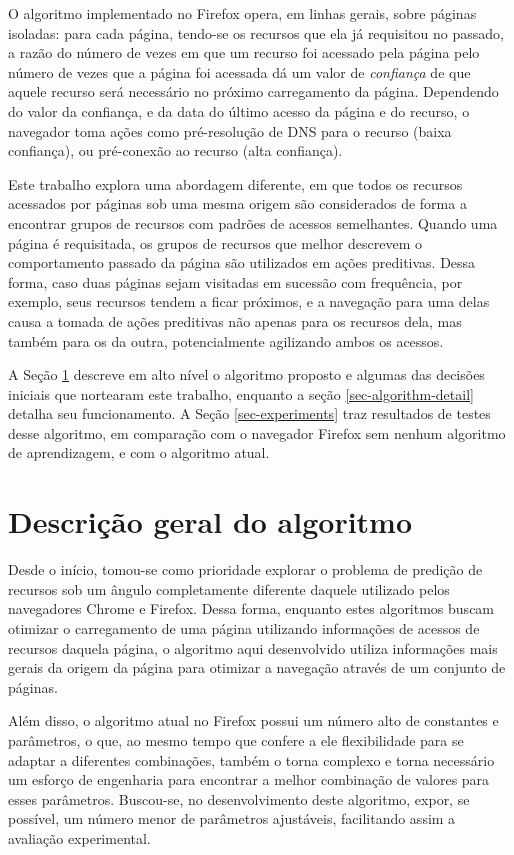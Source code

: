 \documentclass[10pt,twocolumn,letterpaper]{article}
\begin{document}
O algoritmo implementado no Firefox opera, em linhas gerais, sobre páginas isoladas: para cada página, tendo-se os recursos que ela já requisitou no passado, a razão do número de vezes em que um recurso foi acessado pela página pelo número de vezes que a página foi acessada dá um valor de \emph{confiança} de que aquele recurso será necessário no próximo carregamento da página. Dependendo do valor da confiança, e da data do último acesso da página e do recurso, o navegador toma ações como pré-resolução de DNS para o recurso (baixa confiança), ou pré-conexão ao recurso (alta confiança).

Este trabalho explora uma abordagem diferente, em que todos os recursos acessados por páginas sob uma mesma origem são considerados de forma a encontrar grupos de recursos com padrões de acessos semelhantes. Quando uma página é requisitada, os grupos de recursos que melhor descrevem o comportamento passado da página são utilizados em ações preditivas. Dessa forma, caso duas páginas sejam visitadas em sucessão com frequência, por exemplo, seus recursos tendem a ficar próximos, e a navegação para uma delas causa a tomada de ações preditivas não apenas para os recursos dela, mas também para os da outra, potencialmente agilizando ambos os acessos.

A Seção \ref{sec-algorithm-highlevel} descreve em alto nível o algoritmo proposto e algumas das decisões iniciais que nortearam este trabalho, enquanto a seção \ref{sec-algorithm-detail} detalha seu funcionamento. A Seção \ref{sec-experiments} traz resultados de testes desse algoritmo, em comparação com o navegador Firefox sem nenhum algoritmo de aprendizagem, e com o algoritmo atual.

\section{Descrição geral do algoritmo}
\label{sec-algorithm-highlevel}

Desde o início, tomou-se como prioridade explorar o problema de predição de recursos sob um ângulo completamente diferente daquele utilizado pelos navegadores Chrome e Firefox. Dessa forma, enquanto estes algoritmos buscam otimizar o carregamento de uma página utilizando informações de acessos de recursos daquela página, o algoritmo aqui desenvolvido utiliza informações mais gerais da origem da página para otimizar a navegação através de um conjunto de páginas.

Além disso, o algoritmo atual no Firefox possui um número alto de constantes e parâmetros, o que, ao mesmo tempo que confere a ele flexibilidade para se adaptar a diferentes combinações, também o torna complexo e torna necessário um esforço de engenharia para encontrar a melhor combinação de valores para esses parâmetros. Buscou-se, no desenvolvimento deste algoritmo, expor, se possível, um número menor de parâmetros ajustáveis, facilitando assim a avaliação experimental.
\end{document}
